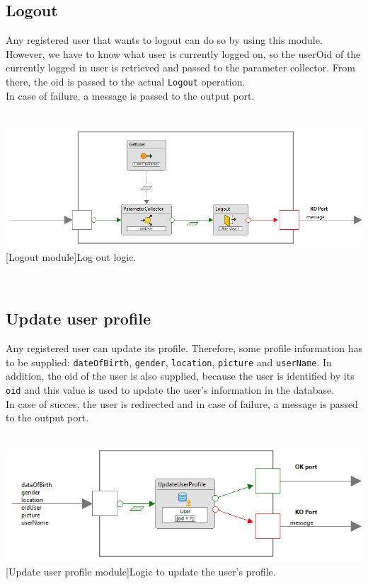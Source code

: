 \documentclass[11pt, a4paper,svglistings,oneside]{book}
\begin{document}
\subsection{Logout}

Any registered user that wants to logout can do so by using this module. However, we have to know what user is currently logged on, so the userOid of the currently logged in user is retrieved and passed to the parameter collector. From there, the oid is passed to the actual \texttt{Logout} operation. \\
In case of failure, a message is passed to the output port.
$\;$ \\ \\
\noindent\begin{minipage}{\textwidth}
    \centering
   \includegraphics[width=1.1\textwidth]{Module_Logout.png}
 [Logout module]{Log out logic.}
\end{minipage}
$\;$ \\ 

\subsection{Update user profile}

Any registered user can update its profile. Therefore, some profile information has to be supplied: \texttt{dateOfBirth}, \texttt{gender}, \texttt{location}, \texttt{picture} and \texttt{userName}. In addition, the oid of the user is also supplied, because the user is identified by its \texttt{oid} and this value is used to update the user's information in the database. \\
In case of succes, the user is redirected and in case of failure, a message is passed to the output port.
$\;$ \\ \\
\noindent\begin{minipage}{\textwidth}
    \centering
   \includegraphics[width=1.1\textwidth]{Module_UpdateProfile.png}
 [Update user profile module]{Logic to update the user's profile.}
\end{minipage}
$\;$ \\ 
\end{document}
